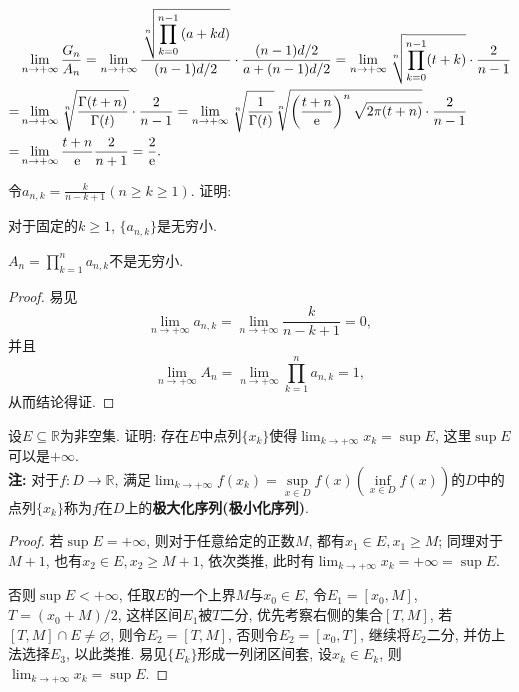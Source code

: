 \begin{quiza}
\begin{solution}
\[\begin{split}
&\lim_{n\rightarrow+\infty}\frac{G_n}{A_n}=\lim_{n\rightarrow+\infty}\frac{\sqrt[n]{\displaystyle\prod_{k=0}^{n-1}\left(a+kd\right)}}{(n-1)d/2}\cdot\frac{(n-1)d/2}{a+(n-1)d/2}=\lim_{n\rightarrow+\infty}\sqrt[n]{\prod_{k=0}^{n-1}(t+k)}\cdot\frac{2}{n-1}\\=&\lim_{n\rightarrow+\infty}\sqrt[n]{\frac{\Gamma(t+n)}{\Gamma(t)}}\cdot\frac{2}{n-1}=\lim_{n\rightarrow+\infty}\sqrt[n]{\frac{1}{\Gamma(t)}}\sqrt[n]{\left(\frac{t+n}{\mathrm{e}}\right)^n\sqrt{2\pi(t+n)}}\cdot\frac{2}{n-1}\\=&\lim_{n\rightarrow+\infty}\frac{t+n}{\mathrm{e}}\frac{2}{n+1}=\frac{2}{\mathrm{e}}.\qedhere
\end{split}\]
\end{solution}
\woe 令\( a_{n,k}=\frac{k}{n-k+1}(n\geqslant k\geqslant 1)\). 证明:
\begin{quizcs}
\item 对于固定的\(k\geqslant 1\), \(\{a_{n,k}\}\)是无穷小.
\item \( A_n=\prod_{k=1}^{n}a_{n,k}\)不是无穷小.
\end{quizcs}
\begin{proof}
易见\[\lim_{n\rightarrow+\infty}a_{n,k}=\lim_{n\rightarrow+\infty}\frac{k}{n-k+1}=0,\]并且\[\lim_{n\rightarrow+\infty}A_n=\lim_{n\rightarrow+\infty}\prod_{k=1}^{n}a_{n,k}=1,\]从而结论得证.
\end{proof}
\woe 设\(E\subseteq\mathbb{R}\)为非空集. 证明: 存在\(E\)中点列\(\{x_k\}\)使得\(\lim_{k\rightarrow+\infty}x_k=\sup E\), 这里\(\sup E\)可以是\(+\infty\).\\\textbf{注: }对于\(f:D\rightarrow\mathbb{R}\), 满足\(\lim_{k\rightarrow+\infty}f(x_k)=\underset{x\in D}{\sup}f(x)\left(\underset{x\in D}{\inf}f(x)\right)\)的\(D\)中的点列\(\{x_k\}\)称为\(f\)在\(D\)上的\textbf{极大化序列(极小化序列)}.
\begin{proof}
若\(\sup E=+\infty\), 则对于任意给定的正数\(M\), 都有\(x_1\in E, x_1\geqslant M\); 同理对于\(M+1\), 也有\(x_2\in E, x_2\geqslant M+1\), 依次类推, 此时有\(\lim_{k\rightarrow+\infty}x_k=+\infty=\sup E\).

否则\(\sup E<+\infty\), 任取\(E\)的一个上界\(M\)与\(x_0\in E\), 令\(E_1=[x_0,M]\), \(T=(x_0+M)/2\), 这样区间\(E_1\)被\(T\)二分, 优先考察右侧的集合\([T,M]\), 若\([T,M]\cap E\ne\varnothing\), 则令\(E_2=[T,M]\), 否则令\(E_2=[x_0,T]\), 继续将\(E_2\)二分, 并仿上法选择\(E_3\), 以此类推. 易见\(\{E_k\}\)形成一列闭区间套, 设\(x_k\in E_k\), 则\(\lim_{k\rightarrow+\infty}x_k=\sup E\).
\end{proof}
\end{quiza}
